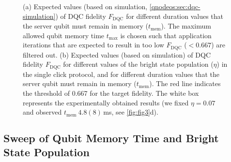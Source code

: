 \begin{figure}[htbp]
    \centering
    \hfill
    \caption{
        (a) Expected values (based on simulation, \cref{qnodeos:sec:dqc-simulation}) of \ac{DQC} fidelity $F_{\text{DQC}}$ for different duration values that the server qubit must remain in memory ($t_{\text{mem}}$). The maximum allowed qubit memory time $t_{\max}$ is chosen such that application iterations that are expected to result in too low $F_{\text{DQC}}$ ($<0.667$) are filtered out.
        (b) Expected values (based on simulation) of \ac{DQC} fidelity $F_{\text{DQC}}$ for different values of the bright state population ($\eta$) in the single click protocol, and for different duration values that the server qubit must remain in memory ($t_{\text{mem}}$). The red line indicates the threshold of 0.667 for the target fidelity. The white box represents the experimentally obtained results (we fixed $\eta = 0.07$ and observed $t_{\text{mem}} ~4.8(8)$\,ms, see \cref{fig:fig3}d).
    }
    \label{fig:delcomp-simulation}
\end{figure}

\subsection{Sweep of Qubit Memory Time and Bright State Population}

